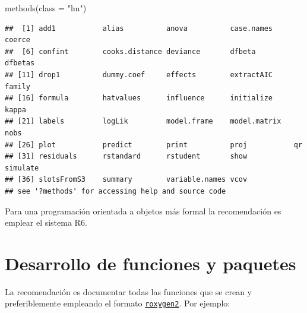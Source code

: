 \documentclass[
]{book}
\newenvironment{Shaded}{\begin{snugshade}}{\end{snugshade}}
\newcommand{\AttributeTok}[1]{\textcolor[rgb]{0.77,0.63,0.00}{#1}}
\newcommand{\FunctionTok}[1]{\textcolor[rgb]{0.00,0.00,0.00}{#1}}
\newcommand{\NormalTok}[1]{#1}
\newcommand{\StringTok}[1]{\textcolor[rgb]{0.31,0.60,0.02}{#1}}
\theoremstyle{break}
\theoremstyle{nonumberplain}
\begin{document}
\begin{Shaded}
\begin{Highlighting}[]
\FunctionTok{methods}\NormalTok{(}\AttributeTok{class =} \StringTok{"lm"}\NormalTok{)}
\end{Highlighting}
\end{Shaded}

\begin{verbatim}
##  [1] add1           alias          anova          case.names     coerce        
##  [6] confint        cooks.distance deviance       dfbeta         dfbetas       
## [11] drop1          dummy.coef     effects        extractAIC     family        
## [16] formula        hatvalues      influence      initialize     kappa         
## [21] labels         logLik         model.frame    model.matrix   nobs          
## [26] plot           predict        print          proj           qr            
## [31] residuals      rstandard      rstudent       show           simulate      
## [36] slotsFromS3    summary        variable.names vcov          
## see '?methods' for accessing help and source code
\end{verbatim}

Para una programación orientada a objetos más formal la recomendación es emplear el sistema R6.

\hypertarget{desarrollo}{%
\section{Desarrollo de funciones y paquetes}\label{desarrollo}}

La recomendación es documentar todas las funciones que se crean y preferiblemente empleando el formato \href{https://roxygen2.r-lib.org}{\texttt{roxygen2}}.
Por ejemplo:
\end{document}
